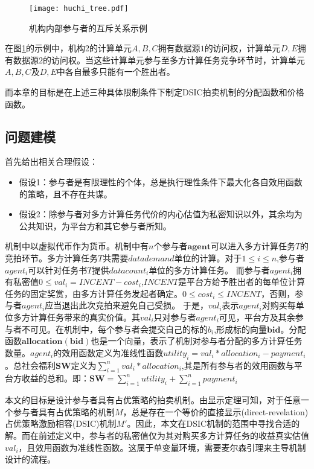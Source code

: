 \documentclass[promaster]{thesis-uestc}
\begin{document}
\begin{figure}[h]
    \texttt{[image: huchi\_tree.pdf]}
    \caption{机构内部参与者的互斥关系示例}
    \label{huchishu}
\end{figure}

在图\ref{huchishu}的示例中，机构2的计算单元$A,B,C$拥有数据源$1$的访问权，计算单元$D,E$拥有数据源$2$的访问权。当这些计算单元参与至多方计算任务竞争环节时，计算单元$A,B,C$及$D,E$中各自最多只能有一个胜出者。

而本章的目标是在上述三种具体限制条件下制定DSIC拍卖机制的分配函数和价格函数。

\FloatBarrier

\subsection{问题建模}
\label{xingshihua}

首先给出相关合理假设：

\begin{itemize}
    \item 假设1：参与者是有限理性的个体，总是执行理性条件下最大化各自效用函数的策略，且不存在共谋。
    \item 假设2：除参与者对多方计算任务代价的内心估值为私密知识以外，其余均为公共知识，为平台方和其它参与者所知。
\end{itemize}

机制中以虚拟代币作为货币。机制中有$n$个参与者$\mathbf{agent}$可以进入多方计算任务$T$的竞拍环节。多方计算任务$T$共需要$datademand$单位的计算。对于$1\leq i\leq n$,参与者$agent_i$可以针对任务书$T$提供$datacount_i$单位的多方计算任务。
而参与者$agent_i$拥有私密值$0 \leq val_i = INCENT-cost_i$,$INCENT$是平台方给予胜出者的每单位计算任务的固定奖赏，由多方计算任务发起者确定。$0 \leq cost_i \leq INCENT$，否则，参与者$agent_i$应当退出此次竞拍来避免自己受损。 于是，$val_i$表示$agent_i$对购买每单位多方计算任务带来的真实价值。其$val_i$只对参与者$agent_i$可见，平台方及其余参与者不可见。在机制中，每个参与者会提交自己的标的$b_i$,形成标的向量$\mathbf{bid}$。分配函数$\mathbf{allocation}(\mathbf{bid})$也是一个向量，表示了机制对参与者分配的多方计算任务数量。$agent_i$的效用函数定义为准线性函数$utility_i = val_i*allocation_i-payment_i$。总社会福利$\mathbf{SW}$定义为$\sum_{i=1}^n{val_i*allocation_i}$,其是所有参与者的效用函数与平台方收益的总和。即：$\mathbf{SW} = \sum_{i=1}^n{utility_i}+\sum_{i=1}^{n}{payment_i}$

本文的目标是设计参与者具有占优策略的拍卖机制。由显示定理可知，对于任意一个参与者具有占优策略的机制$M$，总是存在一个等价的直接显示(direct-revelation)占优策略激励相容(DSIC)机制$M'$。因此，本文在DSIC机制的范围中寻找合适的解。而在前述定义中，参与者的私密值仅为其对购买多方计算任务的收益真实估值$val_i$，且效用函数为准线性函数。这属于单变量环境，需要麦尔森引理来主导机制设计的流程。
\end{document}
